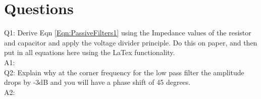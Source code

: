 \documentclass[11pt,letterpaper]{article}
\begin{document}
\section{Questions}

Q1: Derive Eqn \ref{Eqn:PassiveFilters1} using the Impedance values of the resistor and capacitor and apply the voltage divider principle. Do this on paper, and then put in all equations here using the LaTex functionality.\\
A1:\\


Q2:	Explain why at the corner frequency for the low pass filter the amplitude drops by -3dB and you will have a phase shift of 45 degrees.\\
A2:\\
\end{document}
